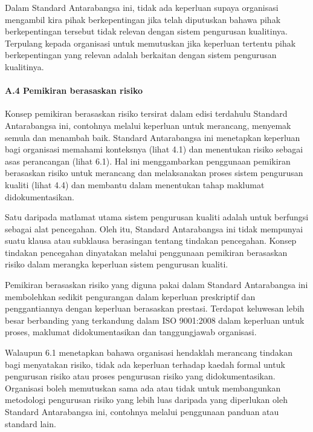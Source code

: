 \documentclass[
]{article}
\begin{document}
Dalam Standard Antarabangsa ini, tidak ada keperluan supaya organisasi
mengambil kira pihak berkepentingan jika telah diputuskan bahawa pihak
berkepentingan tersebut tidak relevan dengan sistem pengurusan
kualitinya. Terpulang kepada organisasi untuk memutuskan jika keperluan
tertentu pihak berkepentingan yang relevan adalah berkaitan dengan
sistem pengurusan kualitinya.

\hypertarget{a.4-pemikiran-berasaskan-risiko}{%
\paragraph{A.4 Pemikiran berasaskan
risiko}\label{a.4-pemikiran-berasaskan-risiko}}

Konsep pemikiran berasaskan risiko tersirat dalam edisi terdahulu
Standard Antarabangsa ini, contohnya melalui keperluan untuk merancang,
menyemak semula dan menambah baik. Standard Antarabangsa ini menetapkan
keperluan bagi organisasi memahami konteksnya (lihat 4.1) dan menentukan
risiko sebagai asas perancangan (lihat 6.1). Hal ini menggambarkan
penggunaan pemikiran berasaskan risiko untuk merancang dan melaksanakan
proses sistem pengurusan kualiti (lihat 4.4) dan membantu dalam
menentukan tahap maklumat didokumentasikan.

Satu daripada matlamat utama sistem pengurusan kualiti adalah untuk
berfungsi sebagai alat pencegahan. Oleh itu, Standard Antarabangsa ini
tidak mempunyai suatu klausa atau subklausa berasingan tentang tindakan
pencegahan. Konsep tindakan pencegahan dinyatakan melalui penggunaan
pemikiran berasaskan risiko dalam merangka keperluan sistem pengurusan
kualiti.

Pemikiran berasaskan risiko yang diguna pakai dalam Standard
Antarabangsa ini membolehkan sedikit pengurangan dalam keperluan
preskriptif dan penggantiannya dengan keperluan berasaskan prestasi.
Terdapat keluwesan lebih besar berbanding yang terkandung dalam ISO
9001:2008 dalam keperluan untuk proses, maklumat didokumentasikan dan
tanggungjawab organisasi.

Walaupun 6.1 menetapkan bahawa organisasi hendaklah merancang tindakan
bagi menyatakan risiko, tidak ada keperluan terhadap kaedah formal untuk
pengurusan risiko atau proses pengurusan risiko yang didokumentasikan.
Organisasi boleh memutuskan sama ada atau tidak untuk membangunkan
metodologi pengurusan risiko yang lebih luas daripada yang diperlukan
oleh Standard Antarabangsa ini, contohnya melalui penggunaan panduan
atau standard lain.
\end{document}
